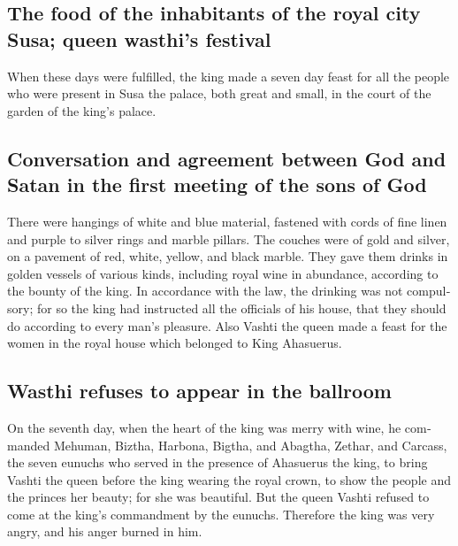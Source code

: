 \begin{paracol}{2}
\begin{otherlanguage}{english}
\hypertarget{the-food-of-the-inhabitants-of-the-royal-city-susa-queen-wasthis-festival}{%
\subsection{The food of the inhabitants of the royal city Susa; queen
wasthi's
festival}\label{the-food-of-the-inhabitants-of-the-royal-city-susa-queen-wasthis-festival}}

 When these days were fulfilled, the king made a seven day
feast for all the people who were present in Susa the palace, both great
and small, in the court of the garden of the king's palace.

\hypertarget{conversation-and-agreement-between-god-and-satan-in-the-first-meeting-of-the-sons-of-god}{%
\subsection{Conversation and agreement between God and Satan in the
first meeting of the sons of
God}\label{conversation-and-agreement-between-god-and-satan-in-the-first-meeting-of-the-sons-of-god}}

 There were hangings of white and blue material, fastened
with cords of fine linen and purple to silver rings and marble pillars.
The couches were of gold and silver, on a pavement of red, white,
yellow, and black marble.  They gave them drinks in golden
vessels of various kinds, including royal wine in abundance, according
to the bounty of the king.  In accordance with the law,
the drinking was not compulsory; for so the king had instructed all the
officials of his house, that they should do according to every man's
pleasure.  Also Vashti the queen made a feast for the
women in the royal house which belonged to King Ahasuerus.

\hypertarget{wasthi-refuses-to-appear-in-the-ballroom}{%
\subsection{Wasthi refuses to appear in the
ballroom}\label{wasthi-refuses-to-appear-in-the-ballroom}}

 On the seventh day, when the heart of the king was merry
with wine, he commanded Mehuman, Biztha, Harbona, Bigtha, and Abagtha,
Zethar, and Carcass, the seven eunuchs who served in the presence of
Ahasuerus the king,  to bring Vashti the queen before the
king wearing the royal crown, to show the people and the princes her
beauty; for she was beautiful.  But the queen Vashti
refused to come at the king's commandment by the eunuchs. Therefore the
king was very angry, and his anger burned in him.


\end{otherlanguage}
\end{paracol}
